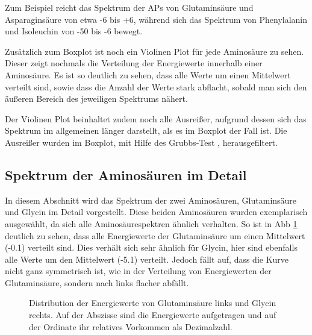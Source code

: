Zum Beispiel reicht das Spektrum der \ac{APs} von Glutaminsäure und Asparaginsäure von etwa -6 bis +6, während sich das Spektrum von Phenylalanin und Isoleuchin von -50 bis -6 bewegt. 

Zusätzlich zum Boxplot ist noch ein Violinen Plot für jede Aminosäure zu sehen. Dieser zeigt nochmals die Verteilung der Energiewerte innerhalb einer Aminosäure. Es ist so deutlich zu sehen, dass alle Werte um einen Mittelwert verteilt sind, sowie dass die Anzahl der Werte stark abflacht, sobald man sich den äußeren Bereich des jeweiligen Spektrums nähert.

Der Violinen Plot beinhaltet zudem noch alle Ausreißer, aufgrund dessen sich das Spektrum im allgemeinen länger darstellt, als es im Boxplot der Fall ist. Die Ausreißer wurden im Boxplot, mit Hilfe des Grubbs-Test \cite{Jain.2010}, herausgefiltert. 


\newpage
\subsection{Spektrum der Aminosäuren im Detail}
In diesem Abschnitt wird das Spektrum der zwei Aminosäuren, Glutaminsäure und Glycin im Detail vorgestellt. Diese beiden Aminosäuren wurden exemplarisch ausgewählt, da sich alle Aminosäurespektren ähnlich verhalten. So ist in \ac{Abb} \ref{fig:ep_as_distr} deutlich zu sehen, dass alle Energiewerte der Glutaminsäure um einen Mittelwert (-0.1) verteilt sind. Dies verhält sich sehr ähnlich für Glycin, hier sind ebenfalls alle Werte um den Mittelwert (-5.1) verteilt. Jedoch fällt auf, dass die Kurve nicht ganz symmetrisch ist, wie in der Verteilung von Energiewerten der Glutaminsäure, sondern nach links flacher abfällt. 

\begin{figure}
    \caption{Distribution der Energiewerte von Glutaminsäure links und Glycin rechts. Auf der Abszisse sind die Energiewerte aufgetragen und auf der Ordinate ihr relatives Vorkommen als Dezimalzahl.} 
    \label{fig:ep_as_distr}
\end{figure}

